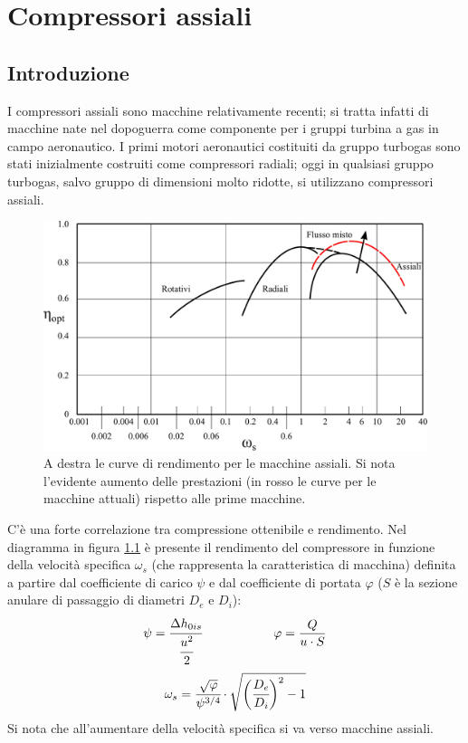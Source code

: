 \chapter{Compressori assiali}

\section{Introduzione}
I compressori assiali sono macchine relativamente recenti; si tratta infatti di macchine nate nel dopoguerra come componente per i gruppi turbina a gas in campo aeronautico. I primi motori aeronautici costituiti da gruppo turbogas sono stati inizialmente costruiti come compressori radiali; oggi in qualsiasi gruppo turbogas, salvo gruppo di dimensioni molto ridotte, si utilizzano compressori assiali.
\begin{figure}[h!]
\centering
  \includegraphics[width=.8\textwidth]{fig/PrestComp.pdf}
\caption{A destra le curve di rendimento per le macchine assiali. Si nota l'evidente aumento delle prestazioni (in rosso le curve per le macchine attuali) rispetto alle prime macchine.}
\label{fig:PrestComp}
\end{figure}

C'è una forte correlazione tra compressione ottenibile e rendimento. Nel diagramma in figura \ref{fig:PrestComp} è presente il rendimento del compressore in funzione della velocità specifica $\omega_s$ (che rappresenta la caratteristica di macchina) definita a partire dal coefficiente di carico $\psi$ e dal coefficiente di portata $\varphi$ ($S$ è la sezione anulare di passaggio di diametri $D_e$ e $D_i$):
\begin{align*}
\psi = \cfrac{\Delta h_{0is}}{\cfrac{u^2}{2}} \hspace{2cm} \varphi = \frac{Q}{u \cdot S}
\end{align*}
\begin{align*}
\omega_s = \cfrac{\sqrt{\varphi}}{\psi^{3/4}} \cdot \sqrt{\bigg( \cfrac{D_e}{D_i} \bigg)^2 -1}
\end{align*}
Si nota che all'aumentare della velocità specifica si va verso macchine assiali.

